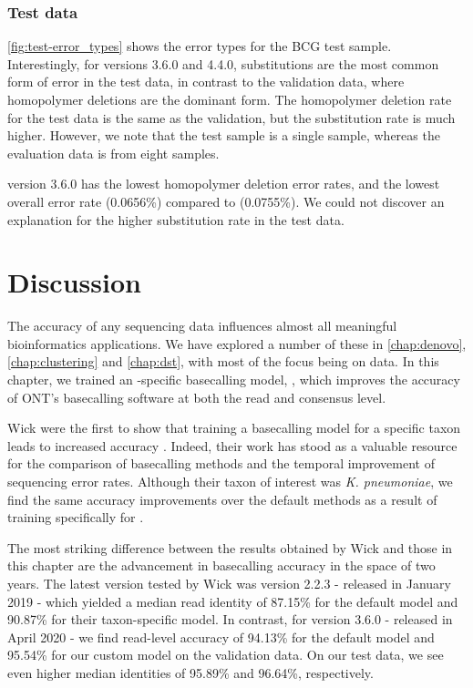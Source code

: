 \begin{figure}
        \label{fig:error_types}
\end{figure}

\subsubsection{Test data}

\autoref{fig:test-error_types} shows the error types for the BCG test sample. Interestingly, for versions 3.6.0 and 4.4.0, substitutions are the most common form of error in the test data, in contrast to the validation data, where homopolymer deletions are the dominant form. The homopolymer deletion rate for the test data is the same as the validation, but the substitution rate is much higher. However, we note that the test sample is a single sample, whereas the evaluation data is from eight samples.

\tubby{} version 3.6.0 has the lowest homopolymer deletion error rates, and the lowest overall error rate (0.0656\%) compared to \guppy{} (0.0755\%). We could not discover an explanation for the higher substitution rate in the test data.

\section{Discussion}
\label{sec:tubby-discussion}

The accuracy of any sequencing data influences almost all meaningful bioinformatics applications. We have explored a number of these in \autoref{chap:denovo}, \autoref{chap:clustering} and \autoref{chap:dst}, with most of the focus being on \ont{} data. In this chapter, we trained an \mtb{}-specific \ont{} basecalling model, \tubby{}, which improves the accuracy of ONT's basecalling software \guppy{} at both the read and consensus level.

Wick \etal{} were the first to show that training a \ont{} basecalling model for a specific taxon leads to increased accuracy \cite{wick2019}. Indeed, their work has stood as a valuable resource for the comparison of basecalling methods and the temporal improvement of \ont{} sequencing error rates. Although their taxon of interest was \textit{K. pneumoniae}, we find the same accuracy improvements over the default methods as a result of training specifically for \mtb{}.

The most striking difference between the results obtained by Wick \etal{} and those in this chapter are the advancement in basecalling accuracy in the space of two years. The latest \guppy{} version tested by Wick \etal{} was version 2.2.3 - released in January 2019 - which yielded a median read identity of 87.15\% for the default model and 90.87\% for their taxon-specific model. In contrast, for \guppy{} version 3.6.0 - released in April 2020 - we find read-level accuracy of 94.13\% for the default model and 95.54\% for our custom \tubby{} model on the validation data. On our test data, we see even higher median identities of 95.89\% and 96.64\%, respectively.

